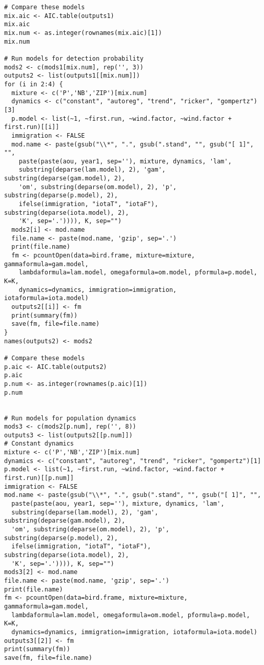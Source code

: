 \documentclass[12pt]{article}
\begin{document}
\begin{verbatim}
# Compare these models
mix.aic <- AIC.table(outputs1)
mix.aic
mix.num <- as.integer(rownames(mix.aic)[1])
mix.num

# Run models for detection probability  
mods2 <- c(mods1[mix.num], rep('', 3))
outputs2 <- list(outputs1[[mix.num]])
for (i in 2:4) {
  mixture <- c('P','NB','ZIP')[mix.num]
  dynamics <- c("constant", "autoreg", "trend", "ricker", "gompertz")[3]
  p.model <- list(~1, ~first.run, ~wind.factor, ~wind.factor + first.run)[[i]]
  immigration <- FALSE
  mod.name <- paste(gsub("\\*", ".", gsub(".stand", "", gsub("[ 1]", "", 
    paste(paste(aou, year1, sep=''), mixture, dynamics, 'lam', 
    substring(deparse(lam.model), 2), 'gam', substring(deparse(gam.model), 2), 
    'om', substring(deparse(om.model), 2), 'p', substring(deparse(p.model), 2), 
    ifelse(immigration, "iotaT", "iotaF"), substring(deparse(iota.model), 2),
    'K', sep='.')))), K, sep="")
  mods2[i] <- mod.name
  file.name <- paste(mod.name, 'gzip', sep='.')
  print(file.name)
  fm <- pcountOpen(data=bird.frame, mixture=mixture, gammaformula=gam.model, 
    lambdaformula=lam.model, omegaformula=om.model, pformula=p.model, K=K, 
    dynamics=dynamics, immigration=immigration, iotaformula=iota.model)
  outputs2[[i]] <- fm
  print(summary(fm))
  save(fm, file=file.name)
}
names(outputs2) <- mods2

# Compare these models
p.aic <- AIC.table(outputs2)
p.aic
p.num <- as.integer(rownames(p.aic)[1])
p.num


# Run models for population dynamics  
mods3 <- c(mods2[p.num], rep('', 8))
outputs3 <- list(outputs2[[p.num]])
# Constant dynamics
mixture <- c('P','NB','ZIP')[mix.num]
dynamics <- c("constant", "autoreg", "trend", "ricker", "gompertz")[1]
p.model <- list(~1, ~first.run, ~wind.factor, ~wind.factor + first.run)[[p.num]]
immigration <- FALSE
mod.name <- paste(gsub("\\*", ".", gsub(".stand", "", gsub("[ 1]", "", 
  paste(paste(aou, year1, sep=''), mixture, dynamics, 'lam', 
  substring(deparse(lam.model), 2), 'gam', substring(deparse(gam.model), 2), 
  'om', substring(deparse(om.model), 2), 'p', substring(deparse(p.model), 2), 
  ifelse(immigration, "iotaT", "iotaF"), substring(deparse(iota.model), 2),
  'K', sep='.')))), K, sep="")
mods3[2] <- mod.name
file.name <- paste(mod.name, 'gzip', sep='.')
print(file.name)
fm <- pcountOpen(data=bird.frame, mixture=mixture, gammaformula=gam.model, 
  lambdaformula=lam.model, omegaformula=om.model, pformula=p.model, K=K, 
  dynamics=dynamics, immigration=immigration, iotaformula=iota.model)
outputs3[[2]] <- fm
print(summary(fm))
save(fm, file=file.name)


\end{verbatim}
\end{document}
